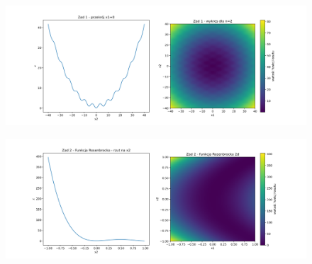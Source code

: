 \documentclass[11pt, a4paper, oneside]{article}
\begin{document}
\begin{figure}[H]
\centerline{\includegraphics[width=\dimexpr.9\textwidth-1em]{grafiki//Wykresy2d/Zad1_2d_heatmap.png}}
\label{fig:zad1:koszt2d}
\end{figure}

\begin{figure}[H]
\centerline{\includegraphics[width=\dimexpr.9\textwidth-1em]{grafiki//Wykresy2d/Rosenbrock_2d_heatmap_close_min.png}}
\label{fig:zad1:koszt2d}
\end{figure}
\end{document}
